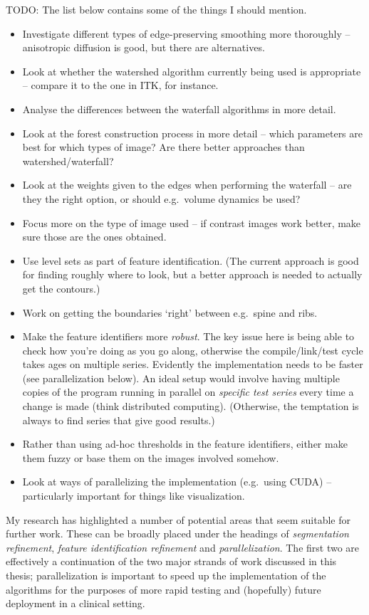 TODO: The list below contains some of the things I should mention.
%
\begin{itemize}
\item Investigate different types of edge-preserving smoothing more thoroughly -- anisotropic diffusion is good, but there are alternatives.
\item Look at whether the watershed algorithm currently being used is appropriate -- compare it to the one in ITK, for instance.
\item Analyse the differences between the waterfall algorithms in more detail.
\item Look at the forest construction process in more detail -- which parameters are best for which types of image? Are there better approaches than watershed/waterfall?
\item Look at the weights given to the edges when performing the waterfall -- are they the right option, or should e.g.~volume dynamics be used?
\item Focus more on the type of image used -- if contrast images work better, make sure those are the ones obtained.
\item Use level sets as part of feature identification. (The current approach is good for finding roughly where to look, but a better approach is needed to actually get the contours.)
\item Work on getting the boundaries `right' between e.g.~spine and ribs.
\item Make the feature identifiers more \emph{robust}. The key issue here is being able to check how you're doing as you go along, otherwise the compile/link/test cycle takes ages on multiple series. Evidently the implementation needs to be faster (see parallelization below). An ideal setup would involve having multiple copies of the program running in parallel on \emph{specific test series} every time a change is made (think distributed computing). (Otherwise, the temptation is always to find series that give good results.)
\item Rather than using ad-hoc thresholds in the feature identifiers, either make them fuzzy or base them on the images involved somehow.
\item Look at ways of parallelizing the implementation (e.g.~using CUDA) -- particularly important for things like visualization.
\end{itemize}

\fi

My research has highlighted a number of potential areas that seem suitable for further work. These can be broadly placed under the headings of \emph{segmentation refinement}, \emph{feature identification refinement} and \emph{parallelization}. The first two are effectively a continuation of the two major strands of work discussed in this thesis; parallelization is important to speed up the implementation of the algorithms for the purposes of more rapid testing and (hopefully) future deployment in a clinical setting.

